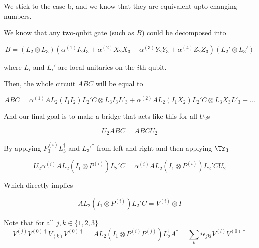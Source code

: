 We stick to the case b, and we know that they are equivalent upto changing numbers.

We know that any two-qubit gate (such as $B$) could be decomposed into

\begin{equation}
  B = (L_2 \otimes L_3) (\alpha^{(1)} I_2 I_3 + \alpha^{(2)} X_2 X_3 + \alpha^{(3)} Y_2 Y_3 + \alpha^{(4)} Z_2 Z_3) (L_2' \otimes L_3')
\end{equation}

where $L_i$ and $L_i'$ are local unitaries on the $i$th qubit.

Then, the whole circuit $ABC$ will be equal to 

\begin{equation}
  ABC = \alpha^{(1)} AL_2 (I_1 I_2) L_2' C \otimes L_3 I_3 L'_3 + \alpha^{(2)} AL_2 (I_1 X_2) L_2' C \otimes L_3 X_3 L'_3 + \dots
\end{equation}

And our final goal is to make a bridge that acts like this for all $U_2$s

\begin{equation}
  U_2 ABC = ABC U_2
\end{equation}

By applying $P^{(i)}_3 L_3^\dagger$ and ${L_3'}^\dagger$ from left and right and then applying $\Tr_3$

\begin{equation}
  U_2 \alpha^{(i)} AL_2 (I_1 \otimes P^{(i)}) L_2' C = \alpha^{(i)} AL_2 (I_1 \otimes  P^{(i)}) L_2' C U_2
\end{equation}

Which directly implies

\begin{equation}
  AL_2 (I_1 \otimes P^{(i)}) L_2' C = V^{(i)} \otimes I
\end{equation}

Note that for all $j, k \in \{1, 2, 3\}$
\begin{equation}
  V^{(j)} V^{(0)\dagger} V_{(k)} V^{(0)\dagger} = AL_2 (I_1 \otimes P^{(i)} P^{(j)}) L_2^\dagger A^\dagger = \sum_k i\epsilon_{jkl} V^{(l)}V^{(0)\dagger}
\end{equation}

